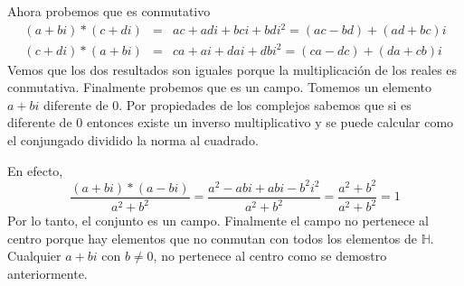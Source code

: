 \documentclass[letter,twoside,12pt]{article}
\begin{document}
Ahora probemos que es conmutativo
\begin{eqnarray}
(a+bi)*(c+di)&=&ac+adi+bci+bdi^2=(ac-bd)+(ad+bc)i\nonumber
\\(c+di)*(a+bi)&=&ca+ai+dai+dbi^2=(ca-dc)+(da+cb)i\nonumber
\end{eqnarray}
Vemos que los dos resultados son iguales porque la multiplicaci\'on de los reales es conmutativa.
Finalmente probemos que es un campo.
Tomemos un elemento $a+bi$ diferente de 0. Por propiedades de los complejos sabemos que si es diferente de 0 entonces existe un inverso multiplicativo y se puede calcular como el conjungado dividido la norma al cuadrado.

En efecto,
\begin{equation}
\frac{(a+bi)*(a-bi)}{a^2+b^2}=\frac{a^2-abi+abi-b^2i^2}{a^2+b^2}=\frac{a^2+b^2}{a^2+b^2}=1 \nonumber
\end{equation}
Por lo tanto, el conjunto es un campo. Finalmente el campo no pertenece al centro porque hay elementos que no conmutan con todos los elementos de $\mathbb{H}$. Cualquier $a+bi$ con $b\not =0$, no pertenece al centro como se demostro anteriormente.
\end{document}
